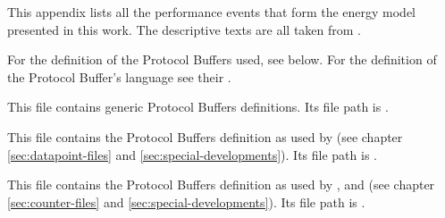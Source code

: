 \appendix
\appendixpage
\addappheadtotoc

\renewcommand\thesection{\Alph{section}}

\label{appendix:chosen-events}

This appendix lists all the performance events that form the energy model
presented in this work. The descriptive texts are all taken from
\cite{intel2011events}.





\label{sec:fmt:datapoints}

For the definition of the Protocol Buffers used, see below. For the definition
of the Protocol Buffer's language see their
.



\label{sec:pb:generic}

This file contains generic Protocol Buffers definitions. Its file path is
.



\label{sec:pb:datapoints}

This file contains the Protocol Buffers definition as used by \JWTlibdp{} (see
chapter \ref{sec:datapoint-files} and \ref{sec:special-developments}). Its file
path is .


\label{sec:pb:counter-files}

This file contains the Protocol Buffers definition as used by \JWTdd{},
\JWTbsle{} and \JWTde{} (see chapter \ref{sec:counter-files} and
\ref{sec:special-developments}). Its file path is
.


